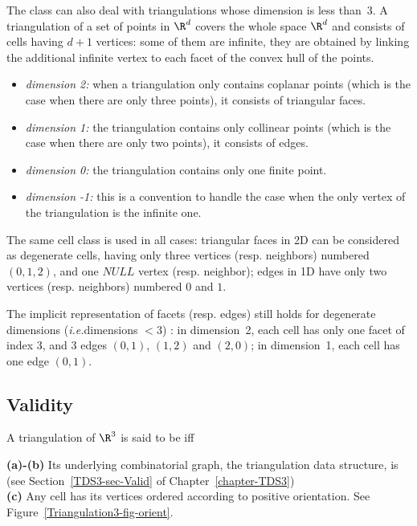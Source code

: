 The class  can also deal with
triangulations whose dimension is less than~3. A triangulation of a
set of points in $\R^d$ covers the whole space $\R^d$ and consists of
cells having $d+1$ vertices: some of them are infinite, they are
obtained by linking the additional infinite vertex to each facet of
the convex hull of the points.
\begin{itemize}
\item {} \emph{dimension 2:} when a triangulation only contains
coplanar points (which is the case when there are only three points), 
it consists of triangular faces.
\item {} \emph{dimension 1:} the triangulation contains only collinear 
points (which is the case when there are only two points), it consists
of edges.
\item {} \emph{dimension 0:} the triangulation contains only one
finite point.
\item {} \emph{dimension -1:} this is a convention to handle the case
when the only vertex of the triangulation is the infinite one.
\end{itemize} 

The same cell class is used in all cases: triangular faces in
2D can be considered as degenerate cells, having only three vertices
(resp. neighbors)
numbered $(0,1,2)$, and one $NULL$ vertex (resp. neighbor);
edges in 1D have only two vertices (resp. neighbors) numbered $0$ and $1$. 

The implicit representation of facets (resp. edges) still holds
for degenerate dimensions (\textit{i.e.}dimensions $<3$) : in
dimension~2, each cell has only one facet of index 3, and 3 edges
$(0,1)$, $(1,2)$ and $(2,0)$; in dimension~1, each cell has one edge
$(0,1)$.  

\subsection{Validity}
\label{Triangulation3-sec-Valid}

A triangulation of $\R^3$ is said to be  iff

{\bf (a)-(b)} Its underlying combinatorial graph, the triangulation
data structure, is  
(see Section~\ref{TDS3-sec-Valid} of Chapter~\ref{chapter-TDS3})\\
{\bf (c)} Any cell has its vertices ordered according to positive
orientation. See Figure~\ref{Triangulation3-fig-orient}.

